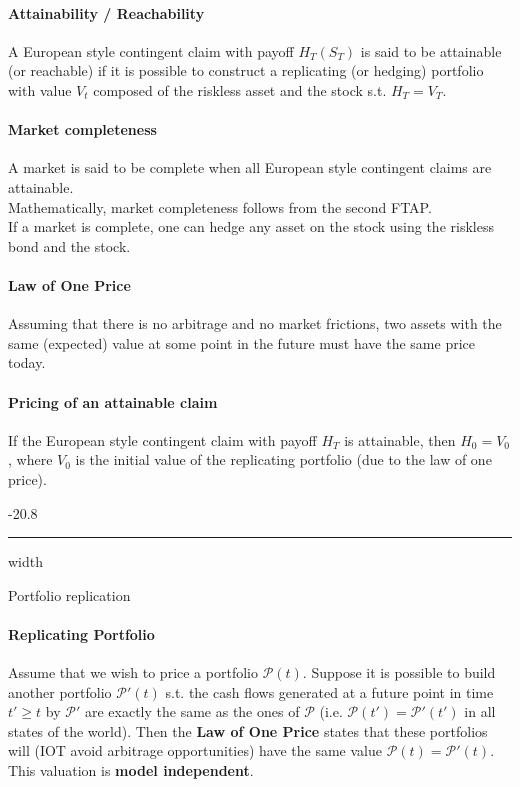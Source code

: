 \documentclass[a4paper,landscape,7pt,fleqn]{scrartcl}
\makeatletter
\renewcommand{\emph}[1]{\textbf{#1}}
\renewcommand{\subsubsection}{\@startsection{subsubsection}{1}{0mm}%
{-2\baselineskip}{0.8\baselineskip}%
{\hrule depth 0.2pt width\columnwidth\vspace*{1.2em}\normalsize\bfseries}}
\makeatother
\begin{document}
\begin{multicols*}{3}
\paragraph{Attainability / Reachability}
A European style contingent claim with payoff $H_T(S_T)$ is said to be attainable (or reachable) if it is possible to construct a replicating (or hedging) portfolio with value $V_t$ composed of the riskless asset and the stock s.t. $H_T = V_T$.

\paragraph{Market completeness}
A market is said to be complete when all European style contingent claims are attainable. \\
Mathematically, market completeness follows from the second FTAP. \\
If a market is complete, one can hedge any asset on the stock using the riskless bond and the stock.

\paragraph{Law of One Price}
Assuming that there is no arbitrage and no market frictions, two assets with the same (expected) value at some point in the future must have the same price today.

\paragraph{Pricing of an attainable claim}
If the European style contingent claim with payoff $H_T$ is attainable, then $H_0 = V_0$, where $V_0$ is the initial value of the replicating portfolio (due to the law of one price).

\subsubsection{Portfolio replication}

\paragraph{Replicating Portfolio}
Assume that we wish to price a portfolio $\mathcal{P}(t)$. Suppose it is possible to build another portfolio $\mathcal{P}'(t)$ s.t. the cash flows generated at a future point in time $t' \geq t$ by $\mathcal{P}'$ are exactly the same as the ones of $\mathcal{P}$ (i.e. $\mathcal{P}(t') = \mathcal{P}'(t')$ in all states of the world). Then the \emph{Law of One Price} states that these portfolios will (IOT avoid arbitrage opportunities) have the same value $\mathcal{P}(t) = \mathcal{P}'(t)$. This valuation is \emph{model independent}.


\end{multicols*}
\end{document}

